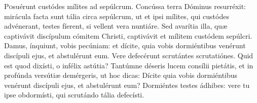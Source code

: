 
\lettrine{P}{o}suérunt custódes mílites ad sepúlcrum. Concússa terra Dóminus resurréxit: mirácula facta sunt tália circa sepúlcrum, ut et ipsi mílites, qui custódes advénerant, testes fíerent, si vellent vera nuntiáre. Sed avarítia illa, quæ captivávit discípulum cómitem Christi, captivávit et mílitem custódem sepúlcri. Damus, ínquiunt, vobis pecúniam: et dícite, quia vobis dormiéntibus venérunt discípuli ejus, et abstulérunt eum. Vere defecérunt scrutántes scrutatiónes. Quid est quod dixísti, o infélix astútia? Tantúmne déseris lucem consílii pietátis, et in profúnda versútiæ demérgeris, ut hoc dicas: Dícite quia vobis dormiéntibus venérunt discípuli ejus, et abstulérunt eum? Dormiéntes testes ádhibes: vere tu i\-pse obdormísti, qui scrutándo tália defecísti.